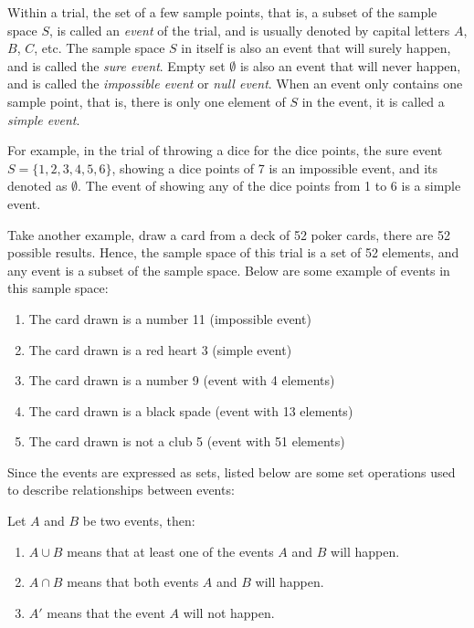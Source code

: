 \documentclass{report}
\begin{document}
\begin{multicols}{2}
  Within a trial, the set of a few sample points, that is, a subset of the sample
  space $S$, is called an \emph{event} of the trial, and is usually denoted by
  capital letters $A$, $B$, $C$, etc. The sample space $S$ in itself is also an
  event that will surely happen, and is called the \emph{sure event}. Empty set
  $\emptyset$ is also an event that will never happen, and is called the
  \emph{impossible event} or \emph{null event}. When an event only contains one
  sample point, that is, there is only one element of $S$ in the event, it is
  called a \emph{simple event}.

  For example, in the trial of throwing a dice for the dice points, the sure
  event $S = \{1, 2, 3, 4, 5, 6\}$, showing a dice points of 7 is an impossible
  event, and its denoted as $\emptyset$. The event of showing any of the dice
  points from 1 to 6 is a simple event.

  Take another example, draw a card from a deck of 52 poker cards, there are 52
  possible results. Hence, the sample space of this trial is a set of 52
  elements, and any event is a subset of the sample space. Below are some example
  of events in this sample space:

  \begin{enumerate}
    \item The card drawn is a number 11 (impossible event)
    \item The card drawn is a red heart 3 (simple event)
    \item The card drawn is a number 9 (event with 4 elements)
    \item The card drawn is a black spade (event with 13 elements)
    \item The card drawn is not a club 5 (event with 51 elements)
  \end{enumerate}

  Since the events are expressed as sets, listed below are some set operations
  used to describe relationships between events:

  Let $A$ and $B$ be two events, then:

  \begin{enumerate}
    \item $A \cup B$ means that at least one of the events $A$ and $B$ will happen.

    \item $A \cap B$ means that both events $A$ and $B$ will happen.

    \item $A'$ means that the event $A$ will not happen.
  \end{enumerate}


\end{multicols}
\end{document}
